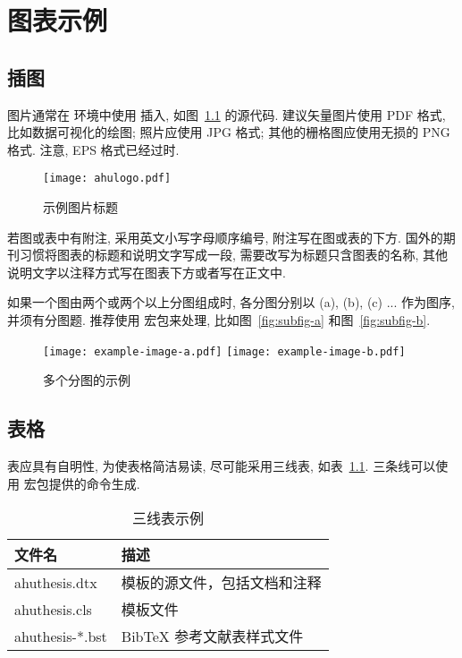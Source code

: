 
\chapter{图表示例}

\section{插图}

图片通常在  环境中使用  插入, 如图~\ref{fig:example} 的源代码.
建议矢量图片使用 PDF 格式, 比如数据可视化的绘图; 照片应使用 JPG 格式; 其他的栅格图应使用无损的 PNG 格式.
注意, EPS 格式已经过时.

\begin{figure}
  \centering
  \texttt{[image: ahulogo.pdf]}
  \caption{示例图片标题}
  \label{fig:example}
\end{figure}

若图或表中有附注, 采用英文小写字母顺序编号, 附注写在图或表的下方.
国外的期刊习惯将图表的标题和说明文字写成一段, 需要改写为标题只含图表的名称,
其他说明文字以注释方式写在图表下方或者写在正文中.

如果一个图由两个或两个以上分图组成时, 各分图分别以 (a), (b), (c) ... 作为图序, 并须有分图题.
推荐使用  宏包来处理, 比如图~\ref{fig:subfig-a} 和图~\ref{fig:subfig-b}.

\begin{figure}
  \centering
    {\texttt{[image: example-image-a.pdf]}}
    {\texttt{[image: example-image-b.pdf]}}
  \caption{多个分图的示例}
  \label{fig:multi-image}
\end{figure}


\section{表格}

表应具有自明性, 为使表格简洁易读, 尽可能采用三线表, 如表~\ref{tab:three-line}.
三条线可以使用  宏包提供的命令生成.

\begin{table}
  \centering
  \caption{三线表示例}
  \begin{tabular}{ll}
    \toprule
    文件名          & 描述                         \\
    \midrule
    ahuthesis.dtx   & 模板的源文件，包括文档和注释 \\
    ahuthesis.cls   & 模板文件                     \\
    ahuthesis-*.bst & BibTeX 参考文献表样式文件    \\
    \bottomrule
  \end{tabular}
  \label{tab:three-line}
\end{table}

